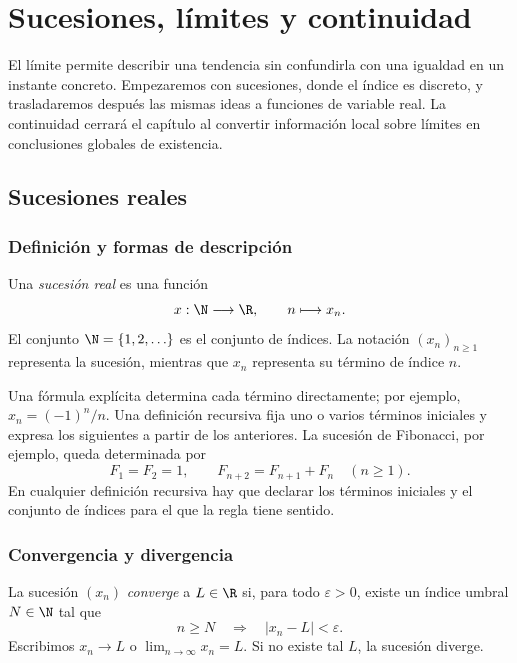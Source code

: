 \chapter{Sucesiones, límites y continuidad}
\label{chap:sucesiones-limites-continuidad}

El límite permite describir una tendencia sin confundirla con una igualdad en
un instante concreto. Empezaremos con sucesiones, donde el índice es discreto,
y trasladaremos después las mismas ideas a funciones de variable real. La
continuidad cerrará el capítulo al convertir información local sobre límites
en conclusiones globales de existencia.

\section{Sucesiones reales}
\label{sec:sucesiones-reales}

\subsection{Definición y formas de descripción}

\begin{definicion}
Una \emph{sucesión real} es una función
\[
  x:\N\longrightarrow\R, \qquad n\longmapsto x_n.
\]
El conjunto \(\N=\{1,2,\ldots\}\) es el conjunto de índices. La notación
\((x_n)_{n\ge1}\) representa la sucesión, mientras que \(x_n\) representa su
término de índice \(n\).
\end{definicion}

Una fórmula explícita determina cada término directamente; por ejemplo,
\(x_n=(-1)^n/n\). Una definición recursiva fija uno o varios términos
iniciales y expresa los siguientes a partir de los anteriores. La sucesión de
Fibonacci, por ejemplo, queda determinada por
\[
  F_1=F_2=1, \qquad F_{n+2}=F_{n+1}+F_n \quad(n\ge1).
\]
En cualquier definición recursiva hay que declarar los términos iniciales y
el conjunto de índices para el que la regla tiene sentido.

\subsection{Convergencia y divergencia}

\begin{definicion}[Convergencia]
La sucesión \((x_n)\) \emph{converge} a \(L\in\R\) si, para todo
\(\varepsilon>0\), existe un índice umbral \(N\in\N\) tal que
\[
  n\ge N \quad\Longrightarrow\quad |x_n-L|<\varepsilon.
\]
Escribimos \(x_n\to L\) o \(\lim_{n\to\infty}x_n=L\). Si no existe tal
\(L\), la sucesión diverge.
\end{definicion}

